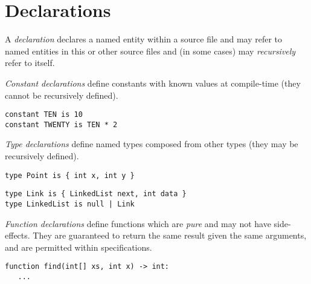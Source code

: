 \documentclass[a4paper,10pt,twcolumn]{article}
\begin{document}


\section*{Declarations}
A {\em declaration} declares a named entity within a source file and may refer to named entities in this or other source files and (in some cases) may {\em recursively} refer to itself.

{\em Constant declarations} define constants with known values at compile-time (they cannot be recursively defined).

\begin{lstlisting}
constant TEN is 10
constant TWENTY is TEN * 2
\end{lstlisting}

{\em Type declarations} define named types composed from other types (they may be recursively defined).

\begin{lstlisting}
type Point is { int x, int y }
\end{lstlisting}

\begin{lstlisting}
type Link is { LinkedList next, int data }
type LinkedList is null | Link
\end{lstlisting}

{\em Function declarations} define functions which are {\em pure} and may not have side-effects.  They are guaranteed to return the same result given the same arguments, and are permitted within specifications. 

\begin{lstlisting}
function find(int[] xs, int x) -> int:
   ...
\end{lstlisting}
\end{document}
